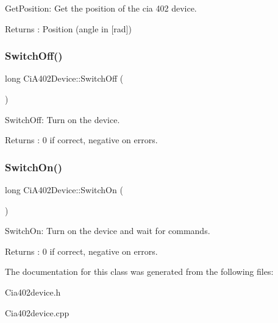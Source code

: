 Get\+Position\+: Get the position of the cia 402 device. 

\begin{DoxyReturn}{Returns}
\+: Position (angle in \mbox{[}rad\mbox{]}) 
\end{DoxyReturn}
\mbox{\label{classCiA402Device_a97acf47b3e3751c85fa70091d3bdfa6a}} 
\subsubsection{\texorpdfstring{Switch\+Off()}{SwitchOff()}}
{\footnotesize\ttfamily long Ci\+A402\+Device\+::\+Switch\+Off (\begin{DoxyParamCaption}{ }\end{DoxyParamCaption})}



Switch\+Off\+: Turn on the device. 

\begin{DoxyReturn}{Returns}
\+: 0 if correct, negative on errors. 
\end{DoxyReturn}
\mbox{\label{classCiA402Device_ab77bce0d7f42429f5f8f092aacb02754}} 
\subsubsection{\texorpdfstring{Switch\+On()}{SwitchOn()}}
{\footnotesize\ttfamily long Ci\+A402\+Device\+::\+Switch\+On (\begin{DoxyParamCaption}{ }\end{DoxyParamCaption})}



Switch\+On\+: Turn on the device and wait for commands. 

\begin{DoxyReturn}{Returns}
\+: 0 if correct, negative on errors. 
\end{DoxyReturn}


The documentation for this class was generated from the following files\+:\begin{DoxyCompactItemize}
\item 
Cia402device.\+h\item 
Cia402device.\+cpp\end{DoxyCompactItemize}
